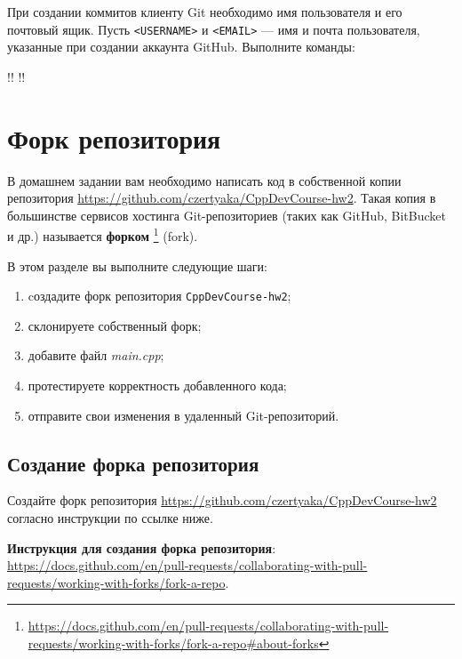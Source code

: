\documentclass[14pt]{extarticle}
\begin{document}
        При создании коммитов клиенту Git необходимо имя пользователя и его почтовый
        ящик.
        Пусть \verb|<USERNAME>| и \verb|<EMAIL>| --- имя и почта пользователя,
        указанные при создании аккаунта GitHub.
        Выполните команды:

        \begin{terminalwindow}
!!
!!
        \end{terminalwindow}

\section{Форк репозитория}

    В домашнем задании вам необходимо написать код в собственной копии
    репозитория \url{https://github.com/czertyaka/CppDevCourse-hw2}.
    Такая копия в большинстве сервисов хостинга Git-репозиториев
    (таких как GitHub, BitBucket и др.) называется \textbf{форком}
    \footnote{\url{https://docs.github.com/en/pull-requests/collaborating-with-pull-requests/working-with-forks/fork-a-repo\#about-forks}}
    (fork).

    В этом разделе вы выполните следующие шаги:

    \begin{enumerate}
        \item cоздадите форк репозитория \texttt{CppDevCourse-hw2};
        \item склонируете собственный форк;
        \item добавите файл \textit{main.cpp};
        \item протестируете корректность добавленного кода;
        \item отправите свои изменения в удаленный Git-репозиторий.
    \end{enumerate}

    \subsection{Создание форка репозитория}

    Создайте форк репозитория \url{https://github.com/czertyaka/CppDevCourse-hw2}
    согласно инструкции по ссылке ниже.

    \begin{tcolorbox}
        \textbf{Инструкция для создания форка репозитория}: \\
        \url{https://docs.github.com/en/pull-requests/collaborating-with-pull-requests/working-with-forks/fork-a-repo}.
    \end{tcolorbox}
\end{document}
